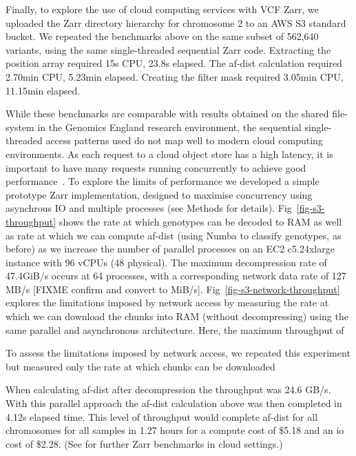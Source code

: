 \documentclass[a4paper,num-refs]{oup-contemporary}
\begin{document}
Finally, to explore the use of cloud computing services with VCF Zarr,
we uploaded the Zarr directory hierarchy for chromosome 2 to an AWS S3 
standard bucket. We repeated the benchmarks above on the same subset
of 562,640 variants, using the same 
single-threaded sequential Zarr code.
Extracting the position array required 15s CPU, 23.8s elapsed.
The af-dist calculation required 2.70min CPU, 5.23min elapsed. 
Creating the filter mask
required 3.05min CPU, 11.15min elapsed. 

While these benchmarks are comparable with results obtained on the 
shared file-system in the Genomics England research environment,
the sequential single-threaded access patterns used do not map
well to modern cloud computing environments.
As each request to a cloud object store has a high latency, it 
is important to have many requests running concurrently to achieve 
good performance~\citep{durner2023exploiting}.
To explore the limits of performance we developed a simple prototype
Zarr implementation, designed to maximise concurrency using asynchrous
IO and multiple processes (see Methods for details).
Fig~\ref{fig-s3-throughput} shows the rate at which genotypes 
can be decoded to RAM as well as rate at which we can compute
af-dist (using Numba to classify genotypes, as before)
as we increase the number of parallel processes on
an EC2 c5.24xlarge instance with 96 vCPUs (48 physical).
The maximum decompression rate of 47.4GiB/s 
occurs at 64 processes, with a corresponding 
network data rate of 127 MB/s [FIXME confirm and convert to MiB/s].
Fig~\ref{fig-s3-network-throughput} explores the limitations imposed by
network access by measuring the rate at which we can download the chunks
into RAM (without decompressing) using the same parallel and asynchronous
architecture. Here, the maximum throughput of 


To assess the limitations imposed by network access, we repeated this
experiment but measured only the rate at which chunks can be downloaded

When calculating af-dist after
decompression the throughput was 24.6 GB/s. With this parallel approach the 
af-dist calculation above was then completed in 4.12s elapsed time.
This level of throughput would complete af-dist for all chromosomes for all samples
in 1.27 hours for a compute cost of \$5.18 and an io cost of \$2.28.
(See \citep{durbin2020task,moore2021ome,gowan2022using} for further Zarr
benchmarks in cloud settings.)
\end{document}
